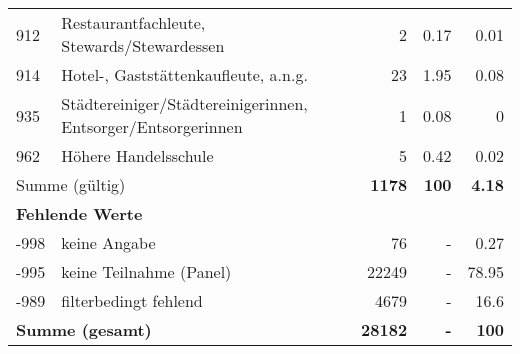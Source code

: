 \begin{longtable}{lXrrr}
        912 & \multicolumn{1}{X}{Restaurantfachleute, Stewards/Stewardessen} & %
          \num{2} &
          \num[round-mode=places,round-precision=2]{0,17} &
          \num[round-mode=places,round-precision=2]{0,01} \\

        914 & \multicolumn{1}{X}{Hotel-, Gaststättenkaufleute, a.n.g.} & %
          \num{23} &
          \num[round-mode=places,round-precision=2]{1,95} &
          \num[round-mode=places,round-precision=2]{0,08} \\

        935 & \multicolumn{1}{X}{Städtereiniger/Städtereinigerinnen, Entsorger/Entsorgerinnen} & %
          \num{1} &
          \num[round-mode=places,round-precision=2]{0,08} &
          \num[round-mode=places,round-precision=2]{0} \\

        962 & \multicolumn{1}{X}{Höhere Handelsschule} & %
          \num{5} &
          \num[round-mode=places,round-precision=2]{0,42} &
          \num[round-mode=places,round-precision=2]{0,02} \\

     \midrule
     \multicolumn{2}{l}{Summe (gültig)} &
       \textbf{\num{1178}} &
     \textbf{100} &
       \textbf{\num[round-mode=places,round-precision=2]{4,18}} \\
     \multicolumn{5}{l}{\textbf{Fehlende Werte}}\\
       -998 &
       keine Angabe &
         \num{76} &
        - &
         \num[round-mode=places,round-precision=2]{0,27} \\
       -995 &
       keine Teilnahme (Panel) &
         \num{22249} &
        - &
         \num[round-mode=places,round-precision=2]{78,95} \\
       -989 &
       filterbedingt fehlend &
         \num{4679} &
        - &
         \num[round-mode=places,round-precision=2]{16,6} \\
     \midrule
     \multicolumn{2}{l}{\textbf{Summe (gesamt)}} &
          \textbf{\num{28182}} &
        \textbf{-} &
        \textbf{100} \\
     \bottomrule
     \end{longtable}
     
